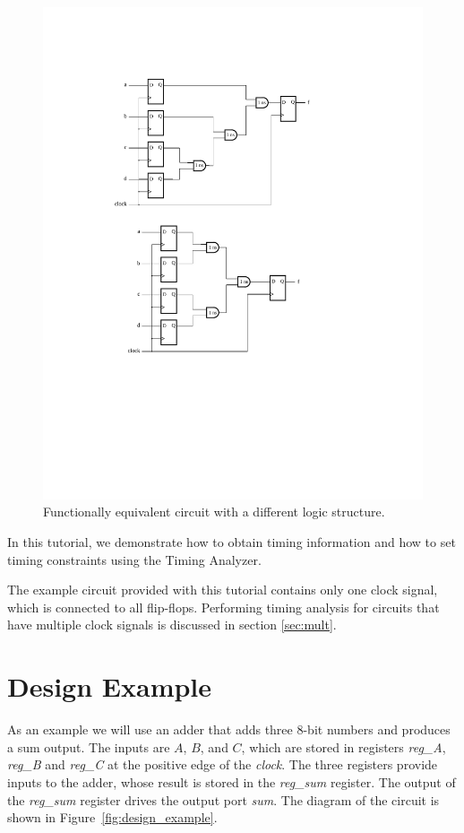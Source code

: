 \documentclass[11pt, twoside, pdftex]{article}
\begin{document}
\begin{figure}[H]
\begin{center}
\includegraphics[scale=.75]{figures/sample_circuit_balanced.pdf}
\end{center}
\caption{Functionally equivalent circuit with a different logic structure.}
\label{fig:fmax_computation_example_optimized}
\end{figure}

In this tutorial, we demonstrate how to obtain timing information and how to set timing 
constraints using the Timing Analyzer.

The example circuit provided with this tutorial contains only one clock signal, which is
connected to all flip-flops. Performing timing analysis for circuits that have
multiple clock signals is discussed in section \ref{sec:mult}.

\section{Design Example}
As an example we will use an adder that adds three 8-bit numbers and produces a sum output. The inputs are $A$, $B$, and $C$, which are
stored in registers {\it reg\_A}, {\it reg\_B} and {\it reg\_C} at the positive edge of the {\it clock}. The three registers provide inputs
to the adder, whose result is stored in the {\it reg\_sum} register. The output of the {\it reg\_sum} register drives
the output port {\it sum}. The diagram of the circuit is shown in Figure~\ref{fig:design_example}.
\end{document}

